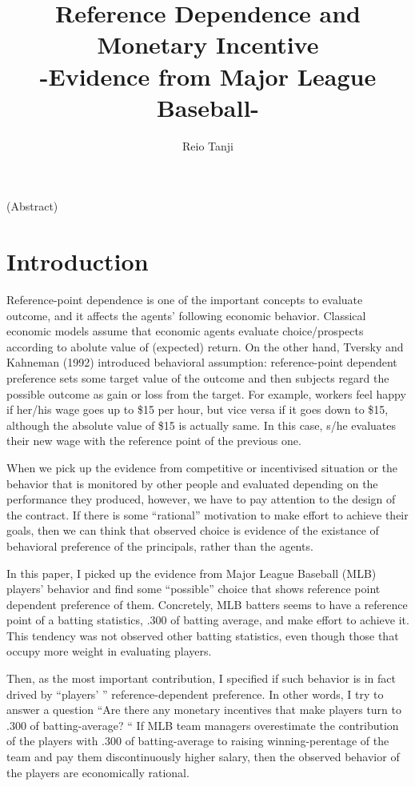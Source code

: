 \documentclass[dvipdfmx, 12pt]{article}
\begin{document}
\title{Reference Dependence and Monetary Incentive \\
-Evidence from Major League Baseball-}
\author{Reio Tanji}
\date{}
\maketitle

\begin{center}
  (Abstract)
\end{center}


\section{Introduction}

Reference-point dependence is one of the important concepts to
evaluate outcome, and it affects the agents' following
economic behavior. Classical economic models assume that
economic agents evaluate choice/prospects according to abolute
value of (expected) return. On the other hand, Tversky and
Kahneman (1992) introduced behavioral
assumption: reference-point dependent preference sets some
target value of the outcome and then subjects regard the
possible outcome as gain or loss from the target.
For example, workers feel happy if her/his wage goes up
to \$15 per hour, but vice versa if it goes down to \$15,
although the absolute value of \$15 is actually same. In this case,
s/he evaluates their new wage with the reference point of
the previous one.

When we pick up the evidence from competitive or incentivised
situation or the behavior that is monitored by other people
and evaluated depending on the performance they produced,
however, we have to pay attention  to the design of the contract.
If there is some ``rational''
motivation to make effort to achieve their goals,
then we can think that observed
choice is evidence of the existance of behavioral preference of
the principals, rather than the agents.

In this paper, I picked up the evidence from Major League Baseball
(MLB) players' behavior and find some ``possible'' choice that
shows reference point dependent preference of them.
Concretely, MLB batters seems to have a reference point of
a batting statistics, .300 of batting average, and make effort
to achieve it. This tendency was not observed other batting statistics,
even though those that occupy more weight in evaluating players.

Then, as the most important contribution, I specified if
such behavior is in fact drived by ``players' ''
reference-dependent preference. In other words, I try to answer
a question ``Are there any monetary incentives that make players
turn to .300 of batting-average? `` If MLB team managers overestimate
the contribution of the players with .300 of batting-average to
raising winning-perentage of the team and pay them discontinuously
higher salary, then the observed behavior of the players are
economically rational.
\end{document}
